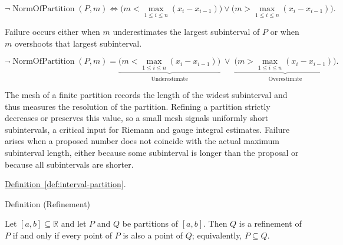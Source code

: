 \begin{remark*}
\[
\neg\operatorname{NormOfPartition}(P,m)
\Longleftrightarrow
\bigl(m<\max_{1\le i\le n}(x_i - x_{i-1})\bigr)\lor\bigl(m>\max_{1\le i\le n}(x_i - x_{i-1})\bigr).
\]
\end{remark*}

\begin{remark*}
Failure occurs either when $m$ underestimates the largest subinterval of $P$ or when $m$ overshoots that largest subinterval.
\end{remark*}

\begin{remark*}
\[
\neg\operatorname{NormOfPartition}(P,m)
=
\underbrace{\bigl(m<\max_{1\le i\le n}(x_i - x_{i-1})\bigr)}_{\text{Underestimate}}
\;\lor\;
\underbrace{\bigl(m>\max_{1\le i\le n}(x_i - x_{i-1})\bigr)}_{\text{Overestimate}}.
\]
\end{remark*}

\begin{remark*}[Interpretation]
The mesh of a finite partition records the length of the widest subinterval and thus measures the resolution of the partition. Refining a partition strictly decreases or preserves this value, so a small mesh signals uniformly short subintervals, a critical input for Riemann and gauge integral estimates. Failure arises when a proposed number does not coincide with the actual maximum subinterval length, either because some subinterval is longer than the proposal or because all subintervals are shorter.
\end{remark*}

\begin{dependencies}
\hyperref[def:interval-partition]{Definition~\ref{def:interval-partition}}.
\end{dependencies}



\begin{definitionbox}{Definition (Refinement)}
\begin{definition}[Refinement]
\label{def:refinement-of-partition}
Let $[a,b] \subseteq \mathbb{R}$ and let $P$ and $Q$ be partitions of $[a,b]$. Then $Q$ is a refinement of $P$ if and only if every point of $P$ is also a point of $Q$; equivalently, $P \subseteq Q$.
\end{definition}
\end{definitionbox}

